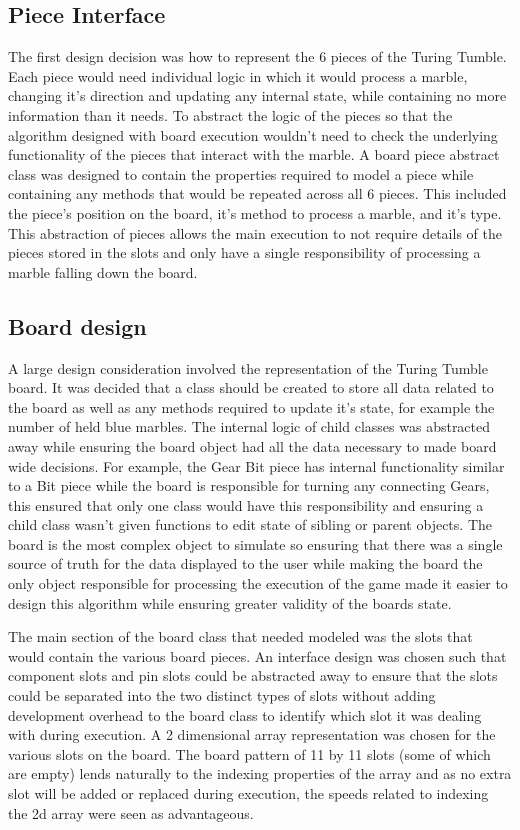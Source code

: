 \documentclass{l4proj}
\begin{document}
\subsection{Piece Interface}
The first design decision was how to represent the 6 pieces of the Turing Tumble. Each piece would need individual logic in which it would process a marble, changing it's direction and updating any internal state, while containing no more information than it needs. To abstract the logic of the pieces so that the algorithm designed with board execution wouldn't need to check the underlying functionality of the pieces that interact with the marble. A board piece abstract class was designed to contain the properties required to model a piece while containing any methods that would be repeated across all 6 pieces. This included the piece's position on the board, it's method to process a marble, and it's type. This abstraction of pieces allows the main execution to not require details of the pieces stored in the slots and only have a single responsibility of processing a marble falling down the board.

\subsection{Board design}
A large design consideration involved the representation of the Turing Tumble board. It was decided that a class should be created to store all data related to the board as well as any methods required to update it's state, for example the number of held blue marbles. The internal logic of child classes was abstracted away while ensuring the board object had all the data necessary to made board wide decisions. For example, the Gear Bit piece has internal functionality similar to a Bit piece while the board is responsible for turning any connecting Gears, this ensured that only one class would have this responsibility and ensuring a child class wasn't given functions to edit state of sibling or parent objects. The board is the most complex object to simulate so ensuring that there was a single source of truth for the data displayed to the user while making the board the only object responsible for processing the execution of the game made it easier to design this algorithm while ensuring greater validity of the boards state. 

The main section of the board class that needed modeled was the slots that would contain the various board pieces. An interface design was chosen such that component slots and pin slots could be abstracted away to ensure that the slots could be separated into the two distinct types of slots without adding development overhead to the board class to identify which slot it was dealing with during execution. A 2 dimensional array representation was chosen for the various slots on the board. The board pattern of 11 by 11 slots (some of which are empty) lends naturally to the indexing properties of the array and as no extra slot will be added or replaced during execution, the speeds related to indexing the 2d array were seen as advantageous. 
\end{document}
